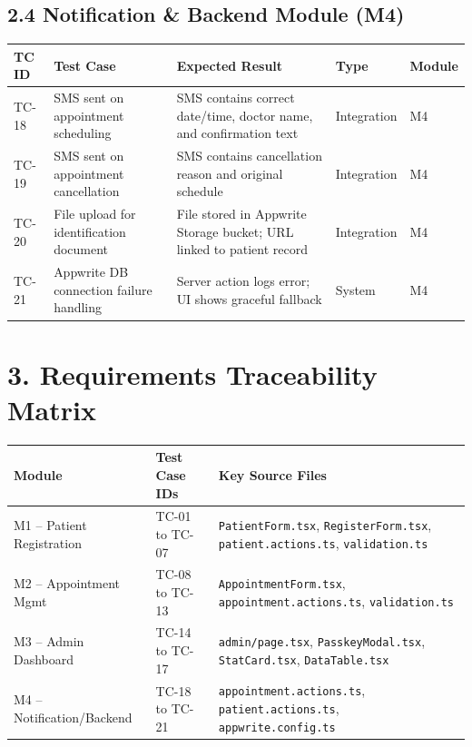 \documentclass[12pt,a4paper]{article}
\begin{document}
\subsection{2.4 Notification \& Backend Module (M4)}

\begin{longtable}{@{}p{1.2cm}p{3.5cm}p{4.5cm}p{2.5cm}p{1.5cm}@{}}
\toprule
\textbf{TC ID} & \textbf{Test Case} & \textbf{Expected Result} & \textbf{Type} & \textbf{Module} \\
\midrule
\endfirsthead

TC-18 & SMS sent on appointment scheduling & SMS contains correct date/time, doctor name, and confirmation text & Integration & M4 \\
\midrule
TC-19 & SMS sent on appointment cancellation & SMS contains cancellation reason and original schedule & Integration & M4 \\
\midrule
TC-20 & File upload for identification document & File stored in Appwrite Storage bucket; URL linked to patient record & Integration & M4 \\
\midrule
TC-21 & Appwrite DB connection failure handling & Server action logs error; UI shows graceful fallback & System & M4 \\
\bottomrule
\end{longtable}

\section{3. Requirements Traceability Matrix}

\begin{center}
\begin{tabular}{@{}llp{7cm}@{}}
\toprule
\textbf{Module} & \textbf{Test Case IDs} & \textbf{Key Source Files} \\
\midrule
M1 -- Patient Registration & TC-01 to TC-07 & \texttt{PatientForm.tsx}, \texttt{RegisterForm.tsx}, \texttt{patient.actions.ts}, \texttt{validation.ts} \\
\midrule
M2 -- Appointment Mgmt & TC-08 to TC-13 & \texttt{AppointmentForm.tsx}, \texttt{appointment.actions.ts}, \texttt{validation.ts} \\
\midrule
M3 -- Admin Dashboard & TC-14 to TC-17 & \texttt{admin/page.tsx}, \texttt{PasskeyModal.tsx}, \texttt{StatCard.tsx}, \texttt{DataTable.tsx} \\
\midrule
M4 -- Notification/Backend & TC-18 to TC-21 & \texttt{appointment.actions.ts}, \texttt{patient.actions.ts}, \texttt{appwrite.config.ts} \\
\bottomrule
\end{tabular}
\end{center}
\end{document}
